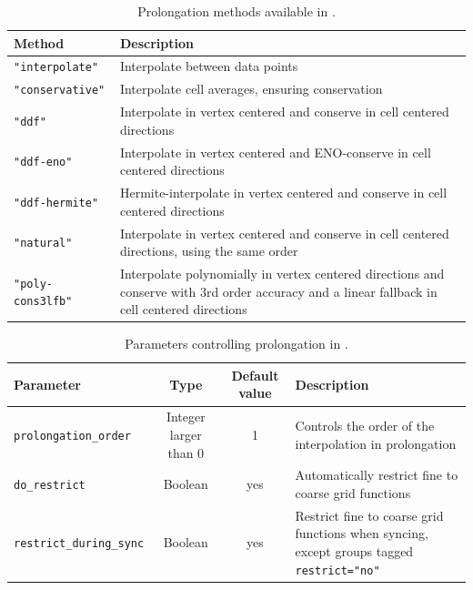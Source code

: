 \begin{table}[ht]
  \centering
  \begin{tabularx}{\textwidth}{lX}
    Method                   & Description                                                                                                                                   \\\hline\hline
    \texttt{"interpolate"}   & Interpolate between data points                                                                                                               \\
    \texttt{"conservative"}  & Interpolate cell averages, ensuring conservation                                                                                              \\
    \texttt{"ddf"}           & Interpolate in vertex centered and conserve in cell centered directions                                                                       \\
    \texttt{"ddf-eno"}       & Interpolate in vertex centered and ENO-conserve in cell centered directions                                                                   \\
    \texttt{"ddf-hermite"}   & Hermite-interpolate in vertex centered and conserve in cell centered directions                                                               \\
    \texttt{"natural"}       & Interpolate in vertex centered and conserve in cell centered directions, using the same order                                                 \\
    \texttt{"poly-cons3lfb"} & Interpolate polynomially in vertex centered directions and conserve with 3rd order accuracy and a linear fallback in cell centered directions \\\hline\hline
  \end{tabularx}
  \caption{Prolongation methods available in \CarpetX.}
  \label{tab:prolongation_methods}
\end{table}

\begin{table}[ht]
  \centering
  \begin{tabularx}{\textwidth}{lccX}
    Parameter                       & Type                  & Default value & Description                                             \\\hline\hline
    \texttt{prolongation\_order}    & Integer larger than 0 & 1             & Controls the order of the interpolation in prolongation \\
    \texttt{do\_restrict}           & Boolean               & yes           & Automatically restrict fine to coarse grid functions    \\
    \texttt{restrict\_during\_sync} & Boolean               & yes           & Restrict fine to coarse grid functions when syncing, except groups tagged \texttt{restrict="no"} \\
  \end{tabularx}
  \caption{Parameters controlling prolongation in \CarpetX.}
  \label{tab:other_prolongation_params}
\end{table}

